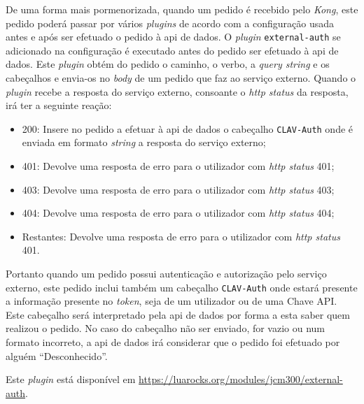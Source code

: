 De uma forma mais pormenorizada, quando um pedido é recebido pelo \textit{Kong}, este pedido poderá passar por vários \textit{plugins} de acordo com a configuração usada antes e após ser efetuado o pedido à \acrshort{api} de dados. O \textit{plugin} \texttt{external-auth} se adicionado na configuração é executado antes do pedido ser efetuado à \acrshort{api} de dados. Este \textit{plugin} obtém do pedido o caminho, o verbo, a \textit{query string} e os cabeçalhos e envia-os no \textit{body} de um pedido que faz ao serviço externo. Quando o \textit{plugin} recebe a resposta do serviço externo, consoante o \textit{\acrshort{http} status} da resposta, irá ter a seguinte reação:
\begin{itemize}
    \item 200: Insere no pedido a efetuar à \acrshort{api} de dados o cabeçalho \texttt{CLAV-Auth} onde é enviada em formato \textit{string} a resposta do serviço externo;
    \item 401: Devolve uma resposta de erro para o utilizador com \textit{\acrshort{http} status} 401;
    \item 403: Devolve uma resposta de erro para o utilizador com \textit{\acrshort{http} status} 403;
    \item 404: Devolve uma resposta de erro para o utilizador com \textit{\acrshort{http} status} 404;
    \item Restantes: Devolve uma resposta de erro para o utilizador com \textit{\acrshort{http} status} 401.

\end{itemize}

Portanto quando um pedido possui autenticação e autorização pelo serviço externo, este pedido inclui também um cabeçalho \texttt{CLAV-Auth} onde estará presente a informação presente no \textit{token}, seja de um utilizador ou de uma Chave API. Este cabeçalho será interpretado pela \acrshort{api} de dados por forma a esta saber quem realizou o pedido. No caso do cabeçalho não ser enviado, for vazio ou num formato incorreto, a \acrshort{api} de dados irá considerar que o pedido foi efetuado por alguém ``Desconhecido''.

Este \textit{plugin} está disponível em \url{https://luarocks.org/modules/jcm300/external-auth}.

